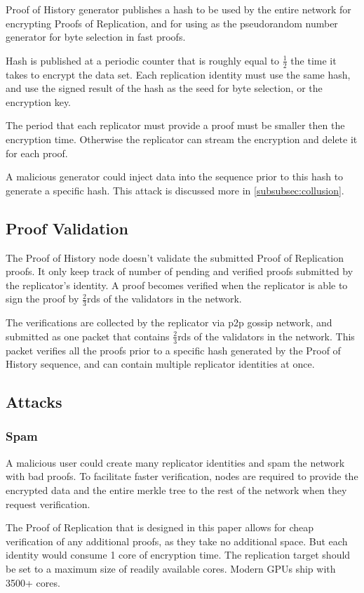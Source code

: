 \documentclass[12pt]{article}
\begin{document}
Proof of History generator publishes a hash to be used by the entire network for encrypting Proofs of Replication, and for using as the pseudorandom number generator for byte selection in fast proofs.

Hash is published at a periodic counter that is roughly equal to \(\frac{1}{2}\) the time it takes to encrypt the data set. Each replication identity must use the same hash, and use the signed result of the hash as the seed for byte selection, or the encryption key.

The period that each replicator must provide a proof must be smaller then the encryption time.  Otherwise the replicator can stream the encryption and delete it for each proof.

A malicious generator could inject data into the sequence prior to this hash to generate a specific hash. This attack is discussed more in \ref{subsubsec:collusion}.

\subsection{Proof Validation}
The Proof of History node doesn’t validate the submitted Proof of Replication proofs. It only keep track of number of pending and verified proofs submitted by the replicator's identity. A proof becomes verified when the replicator is able to sign the proof by \(\frac{2}{3}\)rds of the validators in the network. 

The verifications are collected by the replicator via p2p gossip network, and submitted as one packet that contains \(\frac{2}{3}\)rds of the validators in the network. This packet verifies all the proofs prior to a specific hash generated by the Proof of History sequence, and can contain multiple replicator identities at once.
\subsection{Attacks}
\subsubsection{Spam}
A malicious user could create many replicator identities and spam the network with bad proofs. To facilitate faster verification, nodes are required to provide the encrypted data and the entire merkle tree to the rest of the network when they request verification.

The Proof of Replication that is designed in this paper allows for cheap verification of any additional proofs, as they take no additional space. But each identity would consume 1 core of encryption time. The replication target should be set to a maximum size of readily available cores. Modern GPUs ship with 3500+ cores.
\end{document}
